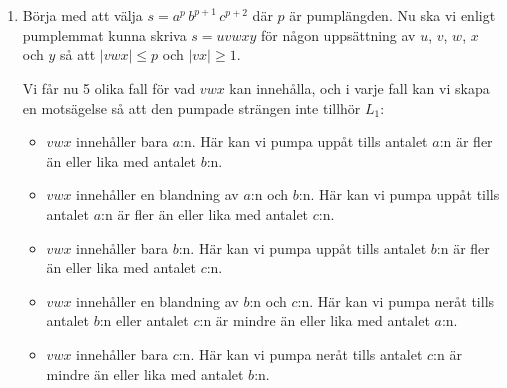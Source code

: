 \documentclass{article}
\begin{document}
\section{}

\begin{enumerate}[label=(\alph*)]
    \item 
        
        
            
        
        Börja med att välja $s = a^p \, b^{p+1} \,  c^{p+2}$ där $p$ är pumplängden. Nu ska vi enligt pumplemmat kunna skriva $s = uvwxy $ för någon uppsättning av $u$, $v$, $w$, $x$ och $y$ så att $| vwx | \le p$ och $|vx| \ge 1$.
        
        Vi får nu 5 olika fall för vad $vwx$ kan innehålla, och i varje fall kan vi skapa en motsägelse så att den pumpade strängen inte tillhör $L_1$:
        
        \begin{itemize}
            \item $vwx$ innehåller bara $a$:n. Här kan vi pumpa uppåt tills antalet $a$:n är fler än eller lika med antalet $b$:n.
            \item $vwx$ innehåller en blandning av $a$:n och $b$:n. Här kan vi pumpa uppåt tills antalet $a$:n är fler än eller lika med antalet $c$:n.
            \item $vwx$ innehåller bara $b$:n. Här kan vi pumpa uppåt tills antalet $b$:n är fler än eller lika med antalet $c$:n. 
            \item $vwx$ innehåller en blandning av $b$:n och $c$:n. Här kan vi pumpa neråt tills antalet $b$:n eller antalet $c$:n är mindre än eller lika med antalet $a$:n.
            \item $vwx$ innehåller bara $c$:n. Här kan vi pumpa neråt tills antalet $c$:n är mindre än eller lika med antalet $b$:n.
        \end{itemize}


\end{enumerate}
\end{document}
